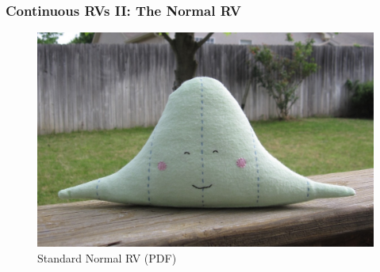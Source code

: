 \documentclass[handout]{beamer}
\date{Lecture \# 12}
\begin{document}
 


\begin{frame}[plain]
	\titlepage 
	

\end{frame} 

\begin{frame}
  \frametitle{Continuous RVs II: The Normal RV}
\begin{figure}
\includegraphics[scale = 0.2]{./images/normal_etsy1}
\caption{Standard Normal RV (PDF)}
\end{figure}
\end{frame}
\end{document}
